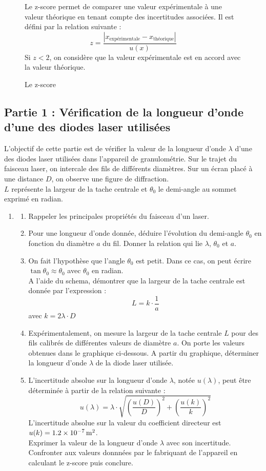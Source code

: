 \documentclass[a4paper,14pt,fleqn]{article}%
\begin{document}
\begin{figure}[h!]
    \caption{Le z-score}
    Le z-score permet de comparer une valeur expérimentale à une valeur théorique en tenant compte des incertitudes associées. Il est défini par la relation suivante : $$ z = \dfrac{|x_{\text{expérimentale}} - x_{\text{théorique}}|}{u(x)} $$
    Si $z < 2$, on considère que la valeur expérimentale est en accord avec la valeur théorique.
\end{figure}

    \subsection*{Partie 1 : Vérification de la longueur d'onde d'une des diodes laser utilisées}
    L'objectif de cette partie est de vérifier la valeur de la longueur d'onde $\lambda$ d'une des diodes laser utilisées dans l'appareil de granulométrie. Sur le trajet du faisceau laser, on intercale des fils de différents diamètres. Sur un écran placé à une distance $D$, on observe une figure de diffraction.\\
    $L$ représente la largeur de la tache centrale et $\theta_0$ le demi-angle au sommet exprimé en radian.

    \begin{enumerate}
        \item \begin{enumerate}
            \item Rappeler les principales propriétés du faisceau d'un laser.
            \item Pour une longueur d'onde donnée, déduire l'évolution du demi-angle $\theta_0$ en fonction du diamètre $a$ du fil. Donner la relation qui lie $\lambda$, $\theta_0$ et $a$.
            \item On fait l'hypothèse que l'angle $\theta_0$ est petit. Dans ce cas, on peut écrire $\tan \theta_0 \approx \theta_0$ avec $\theta_0$ en radian.\\
            A l'aide du schema, démontrer que la largeur de la tache centrale est donnée par l'expression : $$ L = k \cdot \dfrac{1}{a} $$
            avec $k =  2 \lambda \cdot D $
            \item Expérimentalement, on mesure la largeur de la tache centrale $L$ pour des fils calibrés de différentes valeurs de diamètre $a$. On porte les valeurs obtenues dans le graphique ci-dessous. A partir du graphique, déterminer la longueur d'onde $\lambda$ de la diode laser utilisée.
            \item L'incertitude absolue sur la longueur d'onde $\lambda$, notée $u(\lambda)$, peut être déterminée à partir de la relation suivante : $$ u(\lambda) = \lambda \cdot \sqrt{\left(\dfrac{u(D)}{D}\right)^2 + \left(\dfrac{u(k)}{k}\right)^2}$$
            L'incertitude absolue sur la valeur du coefficient directeur est $u(k) = \SI{1,2E-7}{\meter\squared}$.\\
            Exprimer la valeur de la longueur d'onde $\lambda$ avec son incertitude. Confronter aux valeurs donnnées par le fabriquant de l'appareil en calculant le z-score puis conclure.
        \end{enumerate}
    \end{enumerate}
\end{document}
